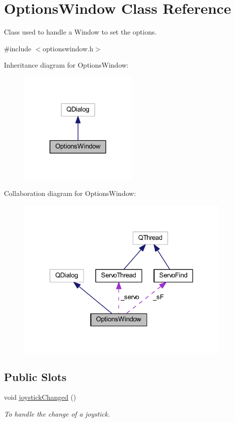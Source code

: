 \hypertarget{a00006}{}\section{Options\+Window Class Reference}
\label{a00006}


Class used to handle a Window to set the options.  




{\ttfamily \#include $<$optionswindow.\+h$>$}



Inheritance diagram for Options\+Window\+:\nopagebreak
\begin{figure}[H]
\begin{center}
\leavevmode
\includegraphics[width=165pt]{d1/dc6/a00037}
\end{center}
\end{figure}


Collaboration diagram for Options\+Window\+:\nopagebreak
\begin{figure}[H]
\begin{center}
\leavevmode
\includegraphics[width=297pt]{d8/d41/a00038}
\end{center}
\end{figure}
\subsection*{Public Slots}
\begin{DoxyCompactItemize}
\item 
void \hyperlink{a00006_ae8c0373be58da710194f8d14f1c3c4dc}{joystick\+Changed} ()
\begin{DoxyCompactList}\small\item\em To handle the change of a joystick. \end{DoxyCompactList}\end{DoxyCompactItemize}
